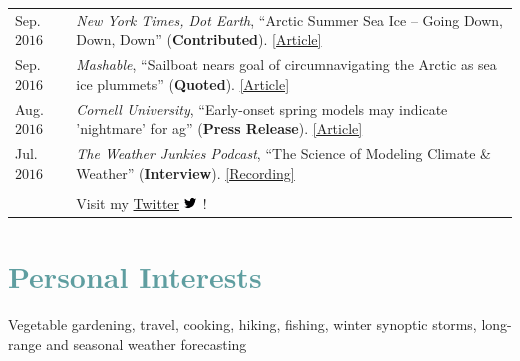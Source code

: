 \documentclass[margin,line,palatino,courier,10pt]{res}
\begin{document}
\begin{resume}
\begin{tabular}{@{}p{0.8in}p{4in}}
Sep. $2016$ & \textit{New York Times, Dot Earth}, ``Arctic Summer Sea Ice -- Going Down, Down, Down'' (\textbf{Contributed}). \href{http://dotearth.blogs.nytimes.com/2016/09/16/arctic-summer-sea-ice-going-down-down-down/?module=BlogPost-ReadMore&version=Blog\%20Main&action=Click&contentCollection=arctic&pgtype=Blogs&region=Body&_r=1#more-58318}{[Article]}\\
Sep. $2016$ & \textit{Mashable}, ``Sailboat nears goal of circumnavigating the Arctic as sea ice plummets'' (\textbf{Quoted}). \href{http://mashable.com/2016/09/01/sailboat-arctic-ice-melt-open-water/#s7nzft8m6sqB}{[Article]}\\
Aug. $2016$ & \textit{Cornell University}, ``Early-onset spring models may indicate 'nightmare' for ag'' (\textbf{Press Release}). \href{http://www.news.cornell.edu/stories/2016/08/early-onset-spring-models-may-indicate-nightmare-ag}{[Article]}\\
Jul. $2016$ & \textit{The Weather Junkies Podcast}, ``The Science of Modeling Climate \& Weather'' (\textbf{Interview}). \href{https://www.youtube.com/watch?v=vgT5P9zC91U}{[Recording]}\\\\

& Visit my \href{https://twitter.com/ZLabe}{Twitter} \includegraphics[height=9pt]{twitter.png}\ !\\
\end{tabular}


\vspace{-0.1in}
\noindent\makebox[\linewidth][r]{\rule{\textwidth}{5pt}}
\vspace{-0.3in}

\section{\sc \textcolor{CadetBlue}{\large{Personal Interests}}}
Vegetable gardening, travel, cooking, hiking, fishing, winter synoptic storms, long-range and seasonal weather forecasting

\end{resume}
\end{document}
